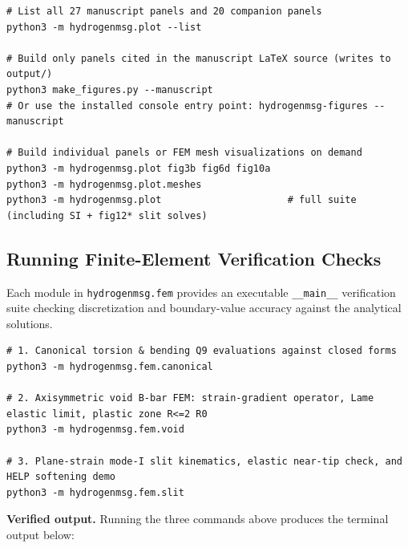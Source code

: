 \documentclass[11pt]{article}
\begin{document}
\noindent\begin{minipage}{\textwidth}
\begin{lstlisting}[style=runshell]
# List all 27 manuscript panels and 20 companion panels
python3 -m hydrogenmsg.plot --list

# Build only panels cited in the manuscript LaTeX source (writes to output/)
python3 make_figures.py --manuscript
# Or use the installed console entry point: hydrogenmsg-figures --manuscript

# Build individual panels or FEM mesh visualizations on demand
python3 -m hydrogenmsg.plot fig3b fig6d fig10a
python3 -m hydrogenmsg.plot.meshes
python3 -m hydrogenmsg.plot                      # full suite (including SI + fig12* slit solves)
\end{lstlisting}
\end{minipage}

\subsection{Running Finite-Element Verification Checks}

Each module in \texttt{hydrogenmsg.fem} provides an executable \texttt{\_\_main\_\_} verification suite checking discretization and boundary-value accuracy against the analytical solutions.

\noindent\begin{minipage}{\textwidth}
\begin{lstlisting}[style=runshell]
# 1. Canonical torsion & bending Q9 evaluations against closed forms
python3 -m hydrogenmsg.fem.canonical

# 2. Axisymmetric void B-bar FEM: strain-gradient operator, Lame elastic limit, plastic zone R<=2 R0
python3 -m hydrogenmsg.fem.void

# 3. Plane-strain mode-I slit kinematics, elastic near-tip check, and HELP softening demo
python3 -m hydrogenmsg.fem.slit
\end{lstlisting}
\end{minipage}

\medskip
\noindent\textbf{Verified output.}
Running the three commands above produces the terminal output below:
\end{document}
